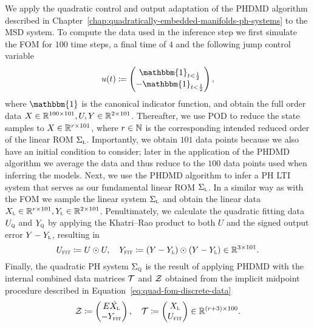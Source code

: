 We apply the quadratic control and output adaptation of the \ac{PHDMD} algorithm described in Chapter~\ref{chap:quadratically-embedded-manifolds-ph-systems} to the \ac{MSD} system.
To compute the data used in the inference step we first simulate the \ac{FOM} for $100$ time steps, a final time of $4$ and the following jump control variable
\begin{equation*}
    u(t) \coloneqq \begin{pmatrix}
        \mathbbm{1}_{t < \frac{1}{2}} \\
        - \mathbbm{1}_{t < \frac{1}{2}}
    \end{pmatrix},
\end{equation*}
where $\mathbbm{1}$ is the canonical indicator function, and obtain the full order data $X \in \mathbb{R}^{100 \times 101}, U, Y \in \mathbb{R}^{2 \times 101}$.
Thereafter, we use \ac{POD} to reduce the state samples to $X \in \mathbb{R}^{r \times 101}$, where $r \in \mathbb{N}$ is the corresponding intended reduced order of the linear \ac{ROM} $\Sigma_{\textnormal{\scshape l}}$.
Importantly, we obtain $101$ data points because we also have an initial condition to consider; later in the application of the \ac{PHDMD} algorithm we average the data and thus reduce to the $100$ data points used when inferring the models.
Next, we use the \ac{PHDMD} algorithm to infer a \ac{PH} \ac{LTI} system that serves as our fundamental linear \ac{ROM} $\Sigma_{\textnormal{\scshape l}}$.
In a similar way as with the \ac{FOM} we sample the linear system $\Sigma_{\textnormal{\scshape l}}$ and obtain the linear data $X_{\textnormal{\scshape l}} \in \mathbb{R}^{r \times 101}, Y_{\textnormal{\scshape l}} \in \mathbb{R}^{2 \times 101}$.
Penultimately, we calculate the quadratic fitting data $U_{\textnormal{\scshape q}}$ and $Y_{\textnormal{\scshape q}}$ by applying the Khatri--Rao product to both $U$ and the signed output error $Y - Y_{\textnormal{\scshape l}}$, resulting in
\begin{equation*}
    U_{\textnormal{\scshape fit}} \coloneqq U \odot U,\quad Y_{\textnormal{\scshape fit}} \coloneqq (Y - Y_{\textnormal{\scshape l}}) \odot (Y - Y_{\textnormal{\scshape l}}) \in \mathbb{R}^{3 \times 101}.
\end{equation*}
Finally, the quadratic \ac{PH} system $\Sigma_{\textnormal{\scshape q}}$ is the result of applying \ac{PHDMD} with the internal combined data matrices $\mathcal{T}$ and $\mathcal{Z}$ obtained from the implicit midpoint procedure described in Equation~\eqref{eq:quad-fom-discrete-data}
\begin{equation*}
    \mathcal{Z} \coloneqq \begin{pmatrix}
        E \dot{X_{\textnormal{\scshape l}}} \\
        -Y_{\textnormal{\scshape fit}}
    \end{pmatrix},\quad \mathcal{T} \coloneqq \begin{pmatrix}
        X_{\textnormal{\scshape l}} \\
        U_{\textnormal{\scshape fit}}
    \end{pmatrix} \in \mathbb{R}^{(r + 3) \times 100}.
\end{equation*}

